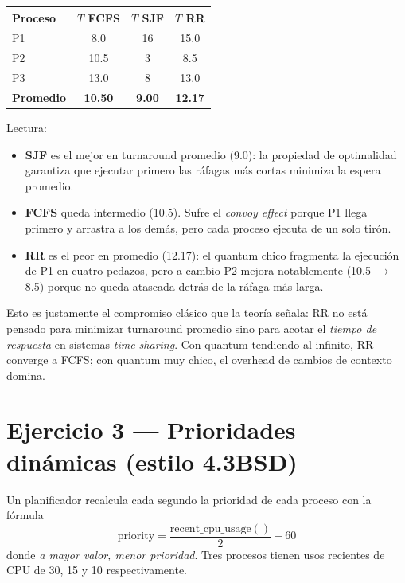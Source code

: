 \documentclass[11pt,a4paper]{article}
\begin{document}
\begin{center}
\small
\begin{tabular}{@{}lccc@{}}
\toprule
Proceso & $T$ FCFS & $T$ SJF & $T$ RR \\
\midrule
P1 & 8.0  & 16  & 15.0 \\
P2 & 10.5 & 3   & 8.5  \\
P3 & 13.0 & 8   & 13.0 \\
\midrule
\textbf{Promedio} & \textbf{10.50} & \textbf{9.00} & \textbf{12.17} \\
\bottomrule
\end{tabular}
\end{center}

Lectura:

\begin{itemize}[leftmargin=*,nosep]
    \item \textbf{SJF} es el mejor en turnaround promedio (9.0): la
        propiedad de optimalidad garantiza que ejecutar primero las
        ráfagas más cortas minimiza la espera promedio.
    \item \textbf{FCFS} queda intermedio (10.5). Sufre el
        \emph{convoy effect} porque P1 llega primero y arrastra a los
        demás, pero cada proceso ejecuta de un solo tirón.
    \item \textbf{RR} es el peor en promedio (12.17): el quantum
        chico fragmenta la ejecución de P1 en cuatro pedazos, pero a
        cambio P2 mejora notablemente (10.5 $\to$ 8.5) porque no
        queda atascada detrás de la ráfaga más larga.
\end{itemize}

Esto es justamente el compromiso clásico que la teoría señala: RR no
está pensado para minimizar turnaround promedio sino para acotar el
\emph{tiempo de respuesta} en sistemas \emph{time-sharing}. Con
quantum tendiendo al infinito, RR converge a FCFS; con quantum muy
chico, el overhead de cambios de contexto domina.

\section{Ejercicio 3 --- Prioridades dinámicas (estilo 4.3BSD)}

Un planificador recalcula cada segundo la prioridad de cada proceso
con la fórmula
\[
\text{priority} = \frac{\text{recent\_cpu\_usage}()}{2} + 60
\]
donde \emph{a mayor valor, menor prioridad}. Tres procesos tienen
usos recientes de CPU de 30, 15 y 10 respectivamente.
\end{document}

